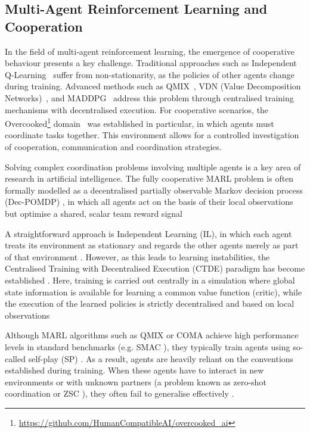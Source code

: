 \subsection*{Multi-Agent Reinforcement Learning and Cooperation}
In the field of multi-agent reinforcement learning, the emergence of cooperative behaviour presents a key challenge. Traditional approaches such as Independent Q-Learning~\cite{TanMARL1993} suffer from non-stationarity, as the policies of other agents change during training. Advanced methods such as QMIX~\cite{RashidQMIX2018}, VDN (Value Decomposition Networks)~\cite{SunehagVDN2018}, and MADDPG~\cite{Lowe2017} address this problem through centralised training mechanisms with decentralised execution. For cooperative scenarios, the Overcooked\footnote{\url{https://github.com/HumanCompatibleAI/overcooked_ai}} domain~\cite{Carroll2019} was established in particular, in which agents must coordinate tasks together. This environment allows for a controlled investigation of cooperation, communication and coordination strategies.


Solving complex coordination problems involving multiple agents is a key area of research in artificial intelligence. The fully cooperative MARL problem is often formally modelled as a decentralised partially observable Markov decision process (Dec-POMDP) \cite{omari2025MACraftax}, in which all agents act on the basis of their local observations but optimise a shared, scalar team reward signal \cite{dewitt2020independentlearningneedstarcraft}


A straightforward approach is Independent Learning (IL), in which each agent treats its environment as stationary and regards the other agents merely as part of that environment \cite{dewitt2020independentlearningneedstarcraft}. However, as this leads to learning instabilities, the Centralised Training with Decentralised Execution (CTDE) \cite{Lowe2017} paradigm has become established
. Here, training is carried out centrally in a simulation where global state information is available for learning a common value function (critic), while the execution of the learned policies is strictly decentralised and based on local observations \cite{Sartoretti_2019}

Although MARL algorithms such as QMIX \cite{RashidQMIX2018} or COMA \cite{foerster2024counterfactualmultiagentpolicygradients}achieve high performance levels in standard benchmarks (e.g. SMAC \cite{samvelyan2019starcraftmultiagentchallenge}), they typically train agents using so-called self-play (SP) \cite{Gupta2017}. As a result, agents are heavily reliant on the conventions established during training. When these agents have to interact in new environments or with unknown partners (a problem known as zero-shot coordination or ZSC \cite{hu2021otherplayzeroshotcoordination}), they often fail to generalise effectively
.


